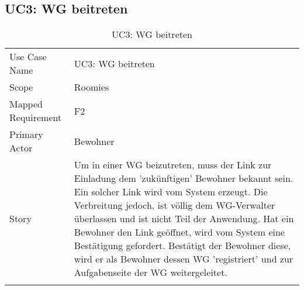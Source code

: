 \subsection{UC3: WG beitreten}
\begin{table}[H]
	\tablestyle
	\tablealtcolored
	\begin{tabularx}{\textwidth}{lX}
		\tablebody
			Use Case Name &
			UC3: WG beitreten
			\tabularnewline
			Scope &
			Roomies
			\tabularnewline
			Mapped Requirement &
			F2
			\tabularnewline
			Primary Actor &
			Bewohner
			\tabularnewline
			Story &
			Um in einer WG beizutreten, muss der Link zur Einladung dem 'zukünftigen' Bewohner bekannt sein. Ein solcher Link wird vom System erzeugt. Die Verbreitung jedoch, ist völlig dem WG-Verwalter überlassen und ist nicht Teil der Anwendung. Hat ein Bewohner den Link geöffnet, wird vom System eine Bestätigung gefordert. Bestätigt der Bewohner diese, wird er als Bewohner dessen WG 'registriert' und zur Aufgabenseite der WG weitergeleitet.
			\tabularnewline
		\tableend
	\end{tabularx}
	\caption{UC3: WG beitreten}
\end{table}


